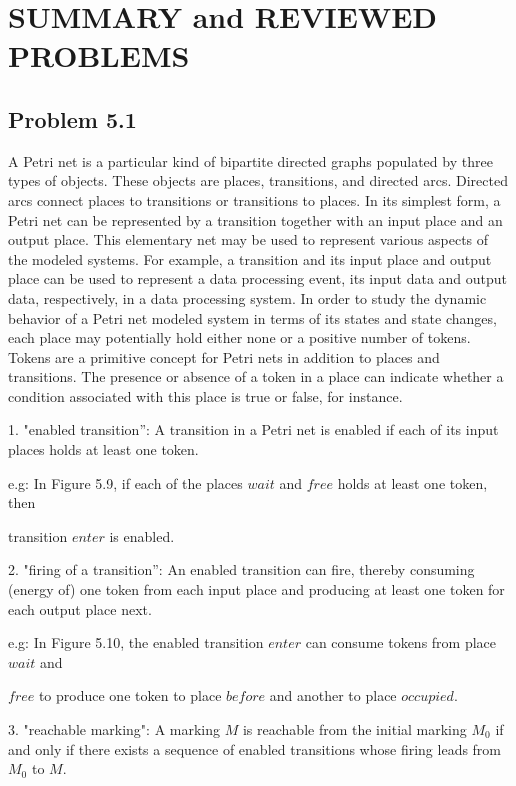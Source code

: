 \documentclass[a4paper]{article}
\begin{document}
\section{SUMMARY and REVIEWED PROBLEMS}
\subsection{Problem 5.1}
A Petri net is a particular kind of bipartite directed graphs populated by three types of objects. These objects are places, transitions, and directed arcs. Directed arcs connect places to transitions or transitions to places. In its simplest form, a Petri net can be represented by a transition together with an input place and an output place. This elementary net may be used to represent various aspects of the modeled systems. For example, a transition and its input place and output place can be used to represent a data processing event, its input data and output data, respectively, in a data processing system. In order to study the dynamic behavior of a Petri net modeled system in terms of its states and state changes, each place may potentially hold either none or a positive number of tokens. Tokens are a primitive concept for Petri nets in addition to places and transitions. The presence or absence of a token in a place can indicate whether a condition associated with this place is true or false, for instance.
\par\null\par
1. "enabled transition”: A transition in a Petri net is enabled if each of its input places holds at least one token.\par
e.g: In Figure 5.9, if each of the places $wait$ and $free$ holds at least one token, then\par transition $enter$ is enabled.
\par\null\par
2. "firing of a transition”: An enabled transition can fire, thereby consuming (energy of) one token from each input place and producing at least one token for each output place next.\par
e.g: In Figure 5.10, the enabled transition $enter$ can consume tokens from place $wait$ and\par
$free$ to produce one token to place $before$ and another to place $occupied$.
\par\null\par
3. "reachable marking": A marking $M$ is reachable from the initial marking $M_0$ if and only if there exists a sequence of enabled transitions whose firing leads from $M_0$ to $M$.\par
\end{document}

